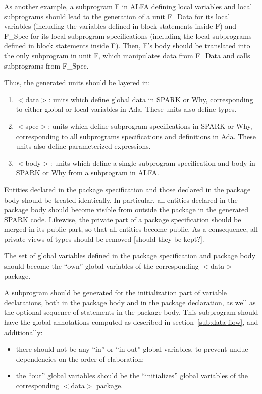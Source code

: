 \documentclass[fullpage]{article}
\newcounter{example}
\begin{document}
As another example, a subprogram F in ALFA defining local variables and local
subprograms should lead to the generation of a unit F\_Data for its local
variables (including the variables defined in block statements inside F) and
F\_Spec for its local subprogram specifications (including the local
subprograms defined in block statements inside F). Then, F's body should be
translated into the only subprogram in unit F, which manipulates data from
F\_Data and calls subprograms from F\_Spec.

Thus, the generated units should be layered in:
\begin{enumerate}
\item $<$data$>$: units which define global data in SPARK or Why, corresponding
  to either global or local variables in Ada. These units also define types.
\item $<$spec$>$: units which define subprogram specifications in SPARK or Why,
  corresponding to all subprograms specifications and definitions in Ada. These
  units also define parameterized expressions.
\item $<$body$>$: units which define a single subprogram specification and body
  in SPARK or Why from a subprogram in ALFA.
\end{enumerate}

Entities declared in the package specification and those declared in the
package body should be treated identically. In particular, all entities
declared in the package body should become visible from outside the package in
the generated SPARK code. Likewise, the private part of a package specification
should be merged in its public part, so that all entities become public. As a
consequence, all private views of types should be removed [should they be
kept?].

The set of global variables defined in the package specification and package
body should become the ``own'' global variables of the corresponding $<$data$>$
package.

A subprogram should be generated for the initialization part of variable
declarations, both in the package body and in the package declaration, as well
as the optional sequence of statements in the package body. This subprogram
should have the global annotations computed as described in
section~\ref{sub:data-flow}, and additionally:
\begin{itemize}
\item there should not be any ``in'' or ``in out'' global variables, to prevent
  undue dependencies on the order of elaboration;
\item the ``out'' global variables should be the ``initializes'' global
  variables of the corresponding $<$data$>$ package.
\end{itemize}
\end{document}
